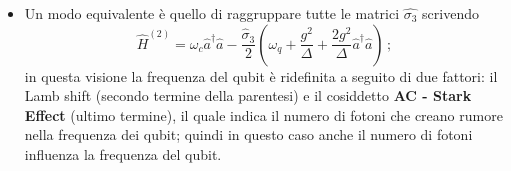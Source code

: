 \begin{itemize}
\begin{itemize}
    \item Un modo equivalente è quello di raggruppare tutte le matrici $\hat{\sigma_3}$ scrivendo
    \begin{equation*}
        \hat H^{(2)}= \omega_c\hat a^\dagger \hat a - \frac{\hat \sigma_3}{2}\left(\omega_q + \frac{g^2}{\Delta}+\frac{2g^2}{\Delta}\hat a^\dagger \hat a \right) \, ;
    \end{equation*}
    in questa visione la frequenza del qubit è ridefinita a seguito di due fattori: il Lamb shift (secondo termine della parentesi) e il cosiddetto \textbf{AC - Stark Effect} (ultimo termine), il quale indica il numero di fotoni che creano rumore nella frequenza dei qubit; quindi in questo caso anche il numero di fotoni influenza la frequenza del qubit. 
    \end{itemize}
\end{itemize}

